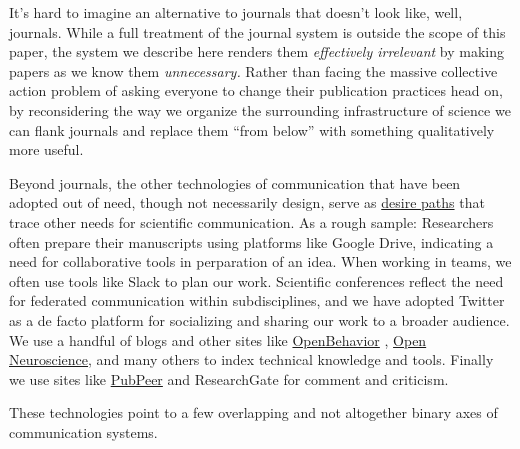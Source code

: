 \documentclass[10pt]{article}
\begin{document}
\begin{multicols}{2}
It's hard to imagine an alternative to journals that doesn't look like,
well, journals. While a full treatment of the journal system is outside
the scope of this paper, the system we describe here renders them
\emph{effectively irrelevant} by making papers as we know them
\emph{unnecessary.} Rather than facing the massive collective action
problem of asking everyone to change their publication practices head
on, by reconsidering the way we organize the surrounding infrastructure
of science we can flank journals and replace them ``from below'' with
something qualitatively more useful.

Beyond journals, the other technologies of communication that have been
adopted out of need, though not necessarily design, serve as
\href{https://en.wikipedia.org/wiki/Desire_path}{desire paths} that
trace other needs for scientific communication. As a rough sample:
Researchers often prepare their manuscripts using platforms like Google
Drive, indicating a need for collaborative tools in perparation of an
idea. When working in teams, we often use tools like Slack to plan our
work. Scientific conferences reflect the need for federated
communication within subdisciplines, and we have adopted Twitter as a de
facto platform for socializing and sharing our work to a broader
audience. We use a handful of blogs and other sites like
\href{https://edspace.american.edu/openbehavior/}{OpenBehavior} \cite{whiteFutureOpenOpenSource2019} ,
\href{https://open-neuroscience.com/}{Open Neuroscience}, and many
others to index technical knowledge and tools. Finally we use sites like
\href{https://pubpeer.com}{PubPeer} and ResearchGate for comment and
criticism.

These technologies point to a few overlapping and not altogether binary
axes of communication systems.

\begin{itemize}


\end{itemize}
\end{multicols}
\end{document}

